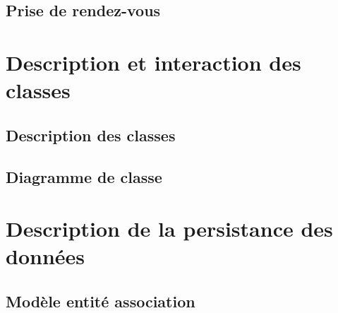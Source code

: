 \documentclass{article}
\begin{document}
\subsection{Prise de rendez-vous}


\section{Description et interaction des classes}
\subsection{Description des classes}

\subsection{Diagramme de classe}

\section{Description de la persistance des données}
\subsection{Modèle entité association}
\end{document}
